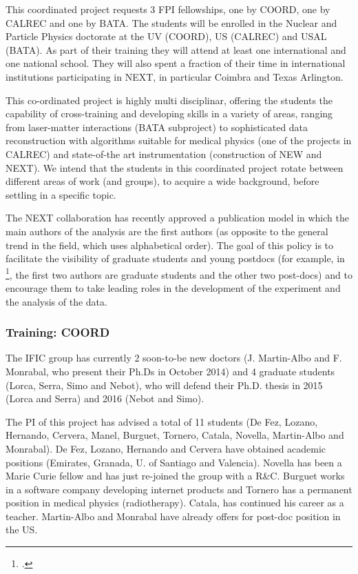 This coordinated project requests 3 FPI fellowships, one by COORD, one by CALREC and one by BATA. The students will be enrolled in the Nuclear and Particle Physics doctorate at the UV (COORD), US (CALREC) and USAL (BATA). As part of their training they will attend at least one international and one national school. They will also spent a fraction of their time in international institutions participating in NEXT, in particular Coimbra and Texas Arlington. 

This co-ordinated project is  highly multi disciplinar, offering the students the capability of cross-training and developing skills in a variety of areas, ranging from laser-matter interactions (BATA subproject) to sophisticated data reconstruction with algorithms suitable for medical physics (one of the projects in CALREC) and state-of-the art instrumentation (construction of NEW and NEXT). We intend that the students in this coordinated project rotate between different areas of work (and groups), to acquire a wide background, before settling in a specific topic. 

The NEXT collaboration has recently approved a publication model in which the main authors of the analysis are the first authors (as opposite to the general trend in the field, which uses alphabetical order). The goal of this policy is to facilitate the visibility of graduate students and young postdocs (for example, in \footcite{Lorca:2014sra}, the first two authors are graduate students and the other two post-docs) and to encourage them to take leading roles in the development of the experiment and the analysis of the data. 

\subsubsection*{Training: COORD}
The IFIC group has currently 2 soon-to-be new doctors (J. Martin-Albo and F. Monrabal, who present their Ph.Ds in October 2014) and 4 graduate students (Lorca, Serra, Simo and Nebot), who will defend their Ph.D. thesis in 2015 (Lorca and Serra) and 2016 (Nebot and Simo). 

The PI of this project has advised a total of 11 students (De Fez, Lozano, Hernando, Cervera, Manel, Burguet, Tornero, Catala, Novella, Martin-Albo and Monrabal). De Fez, Lozano, Hernando and Cervera have obtained academic positions (Emirates, Granada, U. of Santiago and Valencia). Novella has been a Marie Curie fellow and has just re-joined the group with a R\&C. Burguet works in a software company developing internet products and Tornero has a permanent position in medical physics (radiotherapy). Catala, has continued his career as a teacher. Martin-Albo and Monrabal have already offers for post-doc position in the US.

